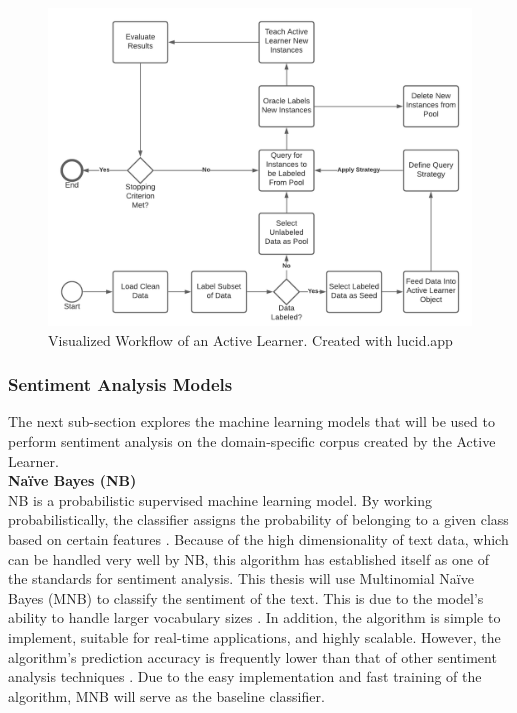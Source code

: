 \documentclass[11pt, a4paper]{article}
\begin{document}
\begin{figure}
    \centering
    \includegraphics[width=\textwidth]{al_workflow.png}
    \caption{Visualized Workflow of an Active Learner. Created with lucid.app}
    \label{fig:AL_Workflow}
\end{figure}

\subsubsection{Sentiment Analysis Models}
The next sub-section explores the machine learning models that will be used to perform sentiment analysis on the domain-specific corpus created by the Active Learner. \\

\noindent\textbf{Naïve Bayes (NB)}\\
NB is a probabilistic supervised machine learning model. By working probabilistically, the classifier assigns the probability of 
belonging to a given class based on certain features \citep{jemai2021SentimentAnalysis}. Because of the high dimensionality of text data, 
which can be handled very well by NB, this algorithm has established itself as one of the standards for sentiment analysis. 
This thesis will use Multinomial Naïve Bayes (MNB) to classify the sentiment of the text. This is due to the model's ability to handle 
larger vocabulary sizes \citep{abbas2019mnb}. In addition, the algorithm is simple to implement, suitable for real-time applications, and highly scalable. 
However, the algorithm's prediction accuracy is frequently lower than that of other sentiment analysis techniques \citep{song2017novelclassification}. 
Due to the easy implementation and fast training of the algorithm, MNB will serve as the baseline classifier.\\
\end{document}
